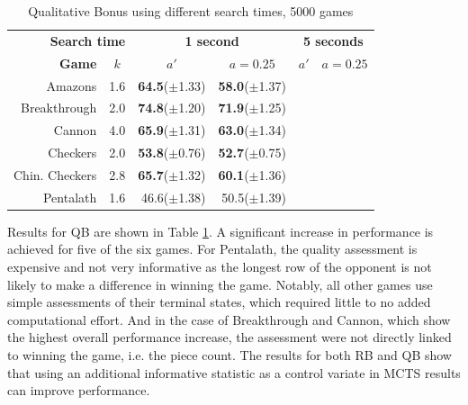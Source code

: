 \documentclass{ecai2014}
\begin{document}
\begin{table}
{\caption{Qualitative Bonus using different search times, 5000 games} \label{tab:qb}}
\begin{center}
\begin{tabular}{rlrrrr}
\hline
\multicolumn{2}{r}{\rule{0pt}{12pt}\textbf{Search time}} & \multicolumn{2}{c}{\textbf{1 second}} & \multicolumn{2}{c}{\textbf{5 seconds}} \\
\cline{1-6}
\rule{0pt}{12pt} \textbf{Game} & \multicolumn{1}{c|}{\textbf{$k$}} 
& \multicolumn{1}{c}{\textbf{$a'$}} & \multicolumn{1}{c}{\textbf{$a = 0.25$}} & \multicolumn{1}{c}{\textbf{$a'$}} & \multicolumn{1}{c}{\textbf{$a = 0.25$}} \\ \hline
Amazons &\multicolumn{1}{l|}{1.6}			& {\bf{64.5}}($\pm$1.33) & {\bf{58.0}}($\pm$1.37) 	&& \\
Breakthrough &\multicolumn{1}{l|}{2.0} 		& {\bf{74.8}}($\pm$1.20) & {\bf{71.9}}($\pm$1.25) 	&& \\
Cannon &\multicolumn{1}{l|}{4.0} 			& {\bf{65.9}}($\pm$1.31) & {\bf{63.0}}($\pm$1.34) 	&& \\
Checkers &\multicolumn{1}{l|}{2.0}			& {\bf{53.8}}($\pm$0.76) & {\bf{52.7}}($\pm$0.75) 	&& \\
Chin. Checkers &\multicolumn{1}{l|}{2.8} 	& {\bf{65.7}}($\pm$1.32) & {\bf{60.1}}($\pm$1.36) 	&& \\
Pentalath &\multicolumn{1}{l|}{1.6} 		& 46.6($\pm$1.38) 	     & 50.5($\pm$1.39) 			&& \\
\hline
\end{tabular}
\end{center}
\end{table}

Results for QB are shown in Table \ref{tab:qb}. A significant increase in performance is achieved for five of the six games. For Pentalath, the quality assessment is expensive and not very informative as the longest row of the opponent is not likely to make a difference in winning the game. Notably, all other games use simple assessments of their terminal states, which required little to no added computational effort. And in the case of Breakthrough and Cannon, which show the highest overall performance increase, the assessment were not directly linked to winning the game, i.e. the piece count. The results for both RB and QB show that using an additional informative statistic as a control variate in MCTS results can improve performance.

\end{document}
